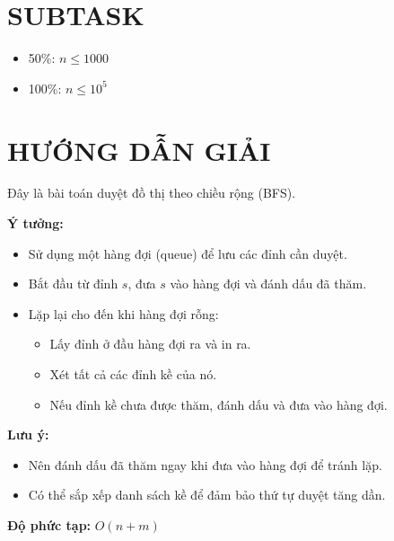 \documentclass[a4paper,12pt]{article}
\begin{document}
\section*{SUBTASK}
\begin{itemize}
    \item 50\%: $n \le 1000$
    \item 100\%: $n \le 10^5$
\end{itemize}
\newpage
\section*{HƯỚNG DẪN GIẢI}
Đây là bài toán duyệt đồ thị theo chiều rộng (BFS).

\textbf{Ý tưởng:}
\begin{itemize}
    \item Sử dụng một hàng đợi (queue) để lưu các đỉnh cần duyệt.
    \item Bắt đầu từ đỉnh $s$, đưa $s$ vào hàng đợi và đánh dấu đã thăm.
    \item Lặp lại cho đến khi hàng đợi rỗng:
    \begin{itemize}
        \item Lấy đỉnh ở đầu hàng đợi ra và in ra.
        \item Xét tất cả các đỉnh kề của nó.
        \item Nếu đỉnh kề chưa được thăm, đánh dấu và đưa vào hàng đợi.
    \end{itemize}
\end{itemize}

\textbf{Lưu ý:}
\begin{itemize}
    \item Nên đánh dấu đã thăm ngay khi đưa vào hàng đợi để tránh lặp.
    \item Có thể sắp xếp danh sách kề để đảm bảo thứ tự duyệt tăng dần.
\end{itemize}

\textbf{Độ phức tạp:} $O(n + m)$
\end{document}
